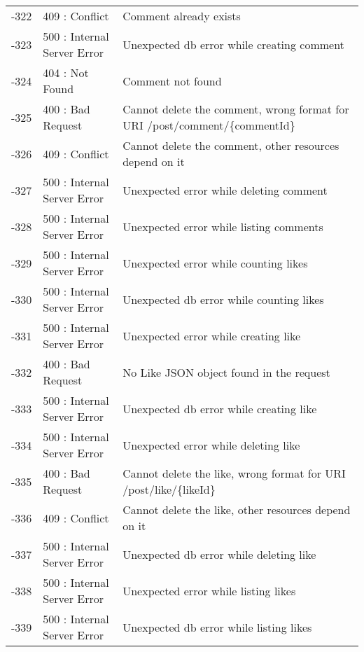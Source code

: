 \begin{longtable}{ | c | l | p{} | }
-322 & 409 : Conflict               & Comment already exists \\
-323 & 500 : Internal Server Error  & Unexpected db error while creating comment \\
-324 & 404 : Not Found              & Comment not found \\
-325 & 400 : Bad Request            & Cannot delete the comment, wrong format for URI /post/comment/\{commentId\} \\
-326 & 409 : Conflict               & Cannot delete the comment, other resources depend on it \\
-327 & 500 : Internal Server Error  & Unexpected error while deleting comment \\
-328 & 500 : Internal Server Error  & Unexpected error while listing comments \\
-329 & 500 : Internal Server Error  & Unexpected error while counting likes \\
-330 & 500 : Internal Server Error  & Unexpected db error while counting likes \\
-331 & 500 : Internal Server Error  & Unexpected error while creating like \\
-332 & 400 : Bad Request            & No Like JSON object found in the request \\
-333 & 500 : Internal Server Error  & Unexpected db error while creating like \\
-334 & 500 : Internal Server Error  & Unexpected error while deleting like \\
-335 & 400 : Bad Request            & Cannot delete the like, wrong format for URI /post/like/\{likeId\} \\
-336 & 409 : Conflict               & Cannot delete the like, other resources depend on it \\
-337 & 500 : Internal Server Error  & Unexpected db error while deleting like \\
-338 & 500 : Internal Server Error  & Unexpected error while listing likes \\
-339 & 500 : Internal Server Error  & Unexpected db error while listing likes \\\hline


\end{longtable}
